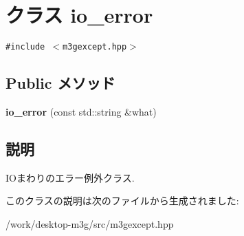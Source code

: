 \hypertarget{classm3g_1_1io__error}{
\section{クラス io\_\-error}
\label{classm3g_1_1io__error}
}
{\tt \#include $<$m3gexcept.hpp$>$}

\subsection*{Public メソッド}
\begin{CompactItemize}
\item 
\hypertarget{classm3g_1_1io__error_89fb3d7ce3f19257f1f68eaf8dd3cc64}{
\textbf{io\_\-error} (const std::string \&what)}
\label{classm3g_1_1io__error_89fb3d7ce3f19257f1f68eaf8dd3cc64}

\end{CompactItemize}


\subsection{説明}
IOまわりのエラー例外クラス. 

このクラスの説明は次のファイルから生成されました:\begin{CompactItemize}
\item 
/work/desktop-m3g/src/m3gexcept.hpp\end{CompactItemize}
